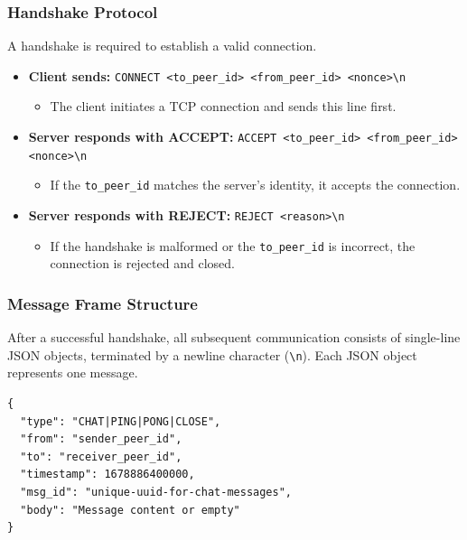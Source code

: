 \subsubsection{Handshake Protocol}
A handshake is required to establish a valid connection.
\begin{itemize}
    \item \textbf{Client sends:} \texttt{CONNECT <to\_peer\_id> <from\_peer\_id> <nonce>\textbackslash n}
    \begin{itemize}
        \item The client initiates a TCP connection and sends this line first.
    \end{itemize}
    \item \textbf{Server responds with ACCEPT:} \texttt{ACCEPT <to\_peer\_id> <from\_peer\_id> <nonce>\textbackslash n}
    \begin{itemize}
        \item If the \texttt{to\_peer\_id} matches the server's identity, it accepts the connection.
    \end{itemize}
    \item \textbf{Server responds with REJECT:} \texttt{REJECT <reason>\textbackslash n}
    \begin{itemize}
        \item If the handshake is malformed or the \texttt{to\_peer\_id} is incorrect, the connection is rejected and closed.
    \end{itemize}
\end{itemize}

\subsubsection{Message Frame Structure}
After a successful handshake, all subsequent communication consists of single-line JSON objects, terminated by a newline character (\texttt{\textbackslash n}). Each JSON object represents one message.

\begin{lstlisting}[caption={General P2P Message Structure}]
{
  "type": "CHAT|PING|PONG|CLOSE",
  "from": "sender_peer_id",
  "to": "receiver_peer_id",
  "timestamp": 1678886400000,
  "msg_id": "unique-uuid-for-chat-messages",
  "body": "Message content or empty"
}
\end{lstlisting}

